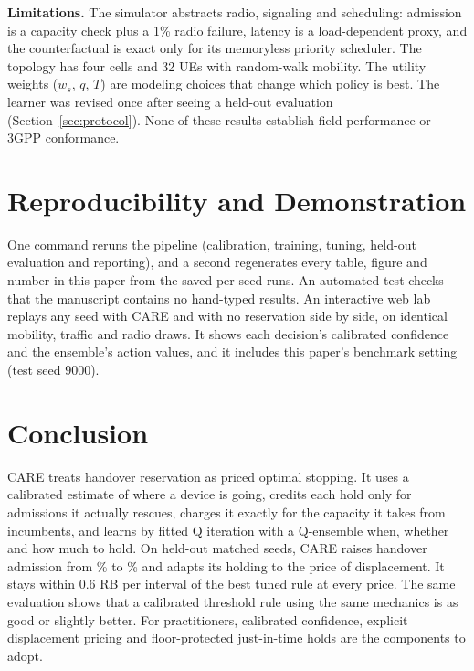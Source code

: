 \documentclass[journal]{IEEEtran}
\begin{document}
\textbf{Limitations.} The simulator abstracts radio, signaling and scheduling: admission is a capacity check plus a 1\% radio failure, latency is a load-dependent proxy, and the counterfactual is exact only for its memoryless priority scheduler. The topology has four cells and 32 UEs with random-walk mobility. The utility weights ($w_s$, $q$, $T$) are modeling choices that change which policy is best. The learner was revised once after seeing a held-out evaluation (Section~\ref{sec:protocol}). None of these results establish field performance or 3GPP conformance.

\section{Reproducibility and Demonstration}
One command reruns the pipeline (calibration, training, tuning, held-out evaluation and reporting), and a second regenerates every table, figure and number in this paper from the saved per-seed runs. An automated test checks that the manuscript contains no hand-typed results. An interactive web lab replays any seed with CARE and with no reservation side by side, on identical mobility, traffic and radio draws. It shows each decision's calibrated confidence and the ensemble's action values, and it includes this paper's benchmark setting (test seed 9000).

\section{Conclusion}
CARE treats handover reservation as priced optimal stopping. It uses a calibrated estimate of where a device is going, credits each hold only for admissions it actually rescues, charges it exactly for the capacity it takes from incumbents, and learns by fitted Q iteration with a Q-ensemble when, whether and how much to hold. On held-out matched seeds, CARE raises handover admission from \NoResHSR\% to \CareHSR\% and adapts its holding to the price of displacement. It stays within $0.6$ RB per interval of the best tuned rule at every price. The same evaluation shows that a calibrated threshold rule using the same mechanics is as good or slightly better. For practitioners, calibrated confidence, explicit displacement pricing and floor-protected just-in-time holds are the components to adopt.



\end{document}
